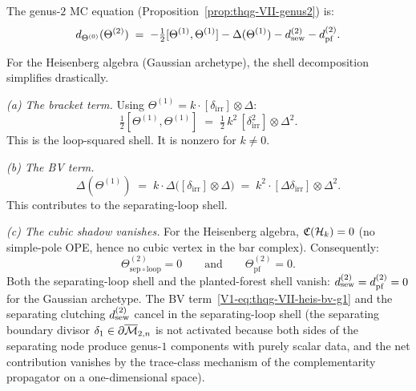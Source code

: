 \begin{computation}
The genus-$2$ MC equation
(Proposition~\ref{prop:thqg-VII-genus2}) is:
\begin{equation}%
d_{\Theta^{(0)}}(\Theta^{(2)})
\;=\;
-\tfrac{1}{2}[\Theta^{(1)},\Theta^{(1)}]
- \Delta(\Theta^{(1)})
- \dsew^{(2)}
- \dpf^{(2)}.
\end{equation}

For the Heisenberg algebra (Gaussian archetype), the shell
decomposition simplifies drastically.

\medskip\noindent\emph{(a) The bracket term.}
Using $\Theta^{(1)} = k \cdot [\delta_{\mathrm{irr}}] \otimes
\Delta$:
\begin{equation}%
\tfrac{1}{2}[\Theta^{(1)},\Theta^{(1)}]
\;=\;
\tfrac{1}{2}\,k^2\,[\delta_{\mathrm{irr}}^2]
\otimes \Delta^2.
\end{equation}
This is the loop-squared shell. It is nonzero for $k \neq 0$.

\medskip\noindent\emph{(b) The BV term.}
\begin{equation}%
\Delta(\Theta^{(1)})
\;=\;
k \cdot \Delta\bigl([\delta_{\mathrm{irr}}] \otimes \Delta\bigr)
\;=\;
k^2 \cdot [\Delta\delta_{\mathrm{irr}}] \otimes \Delta^2.
\end{equation}
This contributes to the separating-loop shell.

\medskip\noindent\emph{(c) The cubic shadow vanishes.}
For the Heisenberg algebra, $\mathfrak{C}(\mathcal{H}_k) = 0$ (no simple-pole
OPE, hence no cubic vertex in the bar complex). Consequently:
\begin{equation}%
\Theta^{(2)}_{\mathrm{sep}\circ\mathrm{loop}} = 0
\qquad\text{and}\qquad
\Theta^{(2)}_{\mathrm{pf}} = 0.
\end{equation}
Both the separating-loop shell and the planted-forest shell
vanish: $d_{\mathrm{sew}}^{(2)} = d_{\mathrm{pf}}^{(2)} = 0$ for the Gaussian
archetype. The BV term~\eqref{V1-eq:thqg-VII-heis-bv-g1} and
the separating clutching $d_{\mathrm{sew}}^{(2)}$ cancel in the
separating-loop shell (the separating boundary divisor
$\delta_1 \in \partial\overline{\mathcal{M}}_{2,n}$ is not activated
because both sides of the separating node produce genus-$1$
components with purely scalar data, and the net contribution
vanishes by the trace-class mechanism of the
complementarity propagator on a one-dimensional space).


\end{computation}
